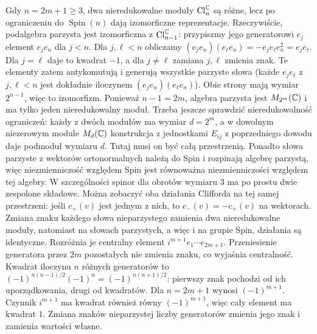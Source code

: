 \begin{uwaga}
Gdy $n=2m+1\geq3$, dwa nieredukowalne moduły
$\operatorname{Cl}^{\mathbb{C}}_n$ są różne, lecz
po ograniczeniu do $\operatorname{Spin}(n)$
dają izomorficzne reprezentacje.
Rzeczywiście, podalgebra parzysta jest
izomorficzna z
$\operatorname{Cl}^{\mathbb{C}}_{n-1}$: przypiszmy
jego generatorowi $e_j$ element $e_je_n$
dla $j<n$. Dla $j,\ell<n$ obliczamy
$(e_je_n)(e_\ell e_n)=-e_je_\ell e_n^2=e_je_\ell$.
Dla $j=\ell$ daje to kwadrat $-1$, a dla $j\ne\ell$
zamiana $j,\ell$ zmienia znak. Te elementy zatem antykomutują i
generują wszystkie parzyste słowa
(każde $e_je_\ell$ z $j,\ell<n$ jest dokładnie
iloczynem $(e_je_n)(e_\ell e_n)$). Obie strony mają
wymiar $2^{n-1}$, więc to izomorfizm.
Ponieważ $n-1=2m$, algebra parzysta jest
$M_{2^m}(\mathbb{C})$ i ma tylko jeden nieredukowalny
moduł. Trzeba jeszcze sprawdzić nieredukowalność ograniczeń:
każdy z dwóch modułów ma wymiar $d=2^m$, a w dowolnym
niezerowym module $M_d(\mathbb{C})$ konstrukcja z jednostkami $E_{ij}$
z poprzedniego dowodu daje podmoduł wymiaru $d$.
Tutaj musi on być całą przestrzenią. Ponadto słowa parzyste
z wektorów ortonormalnych należą do Spin i rozpinają algebrę
parzystą, więc niezmienniczość względem Spin jest równoważna
niezmienniczości względem tej algebry.
W szczególności spinor dla obrotów
wymiaru $3$ ma po prostu dwie zespolone składowe.
Można zobaczyć oba działania Clifforda na tej samej przestrzeni:
jeśli $c_+(v)$ jest jednym z nich, to $c_-(v)=-c_+(v)$
na wektorach. Zmiana znaku każdego słowa nieparzystego
zamienia dwa nieredukowalne moduły, natomiast na słowach
parzystych, a więc i na grupie Spin, działania są identyczne.
Rozróżnia je centralny element
$i^{m+1}e_1\cdots e_{2m+1}$.
Przeniesienie generatora przez $2m$ pozostałych nie zmienia
znaku, co wyjaśnia centralność.
Kwadrat iloczynu $n$ różnych generatorów to
$(-1)^{n(n-1)/2}(-1)^n=(-1)^{n(n+1)/2}$:
pierwszy znak pochodzi od ich uporządkowania, drugi od kwadratów.
Dla $n=2m+1$ wynosi $(-1)^{m+1}$.
Czynnik $i^{m+1}$ ma kwadrat również równy $(-1)^{m+1}$,
więc cały element ma kwadrat $1$.
Zmiana znaków nieparzystej liczby generatorów zmienia jego znak
i zamienia wartości własne.
\end{uwaga}

